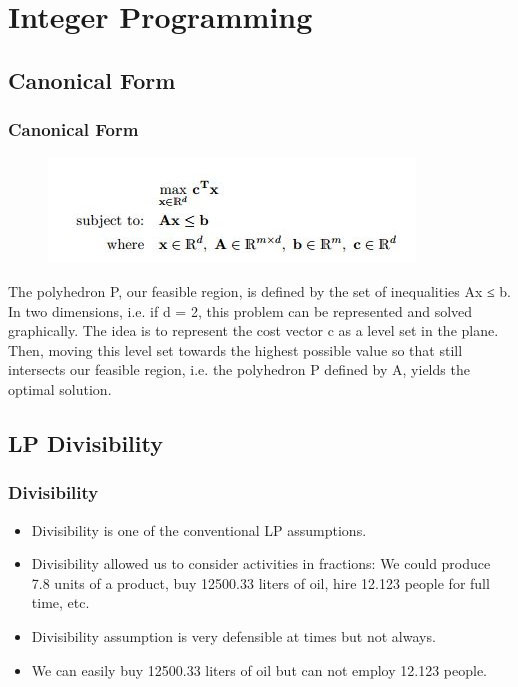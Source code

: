 \documentclass{beamer}
\begin{document}
\section{Integer Programming}
\subsection{Canonical Form}
\begin{frame}
	\frametitle{Canonical Form}
\begin{figure}
\centering
\includegraphics[width=0.7\linewidth]{canonical}
\caption{}
\label{fig:canonical}
\end{figure}
The polyhedron P, our feasible region, is defined by the set of inequalities Ax ≤ b. In two
dimensions, i.e. if d = 2, this problem can be represented and solved graphically. The idea
is to represent the cost vector c as a level set in the plane. Then, moving this level set
towards the highest possible value so that still intersects our feasible region, i.e. the polyhedron
P defined by A, yields the optimal solution.
\end{frame}

\subsection{LP Divisibility}
\begin{frame}
\frametitle{Divisibility}	
\begin{itemize}
\item Divisibility is one of the conventional LP assumptions.
\item Divisibility allowed us to consider activities in fractions: We could produce 7.8 units of a product,
buy 12500.33 liters of oil, hire 12.123 people for full time, etc. 
\item Divisibility assumption is very defensible at
times but not always. 
\item We can easily buy 12500.33 liters of oil but can not employ 12.123 people. 
\end{itemize}
\end{frame}
\end{document}
